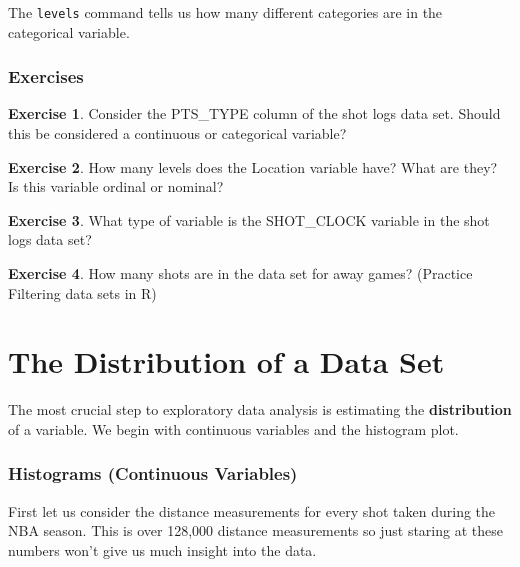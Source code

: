 \documentclass[
]{book}
\theoremstyle{definition}
\theoremstyle{definition}
\theoremstyle{definition}
\newtheorem{exercise}{Exercise}[chapter]
\theoremstyle{definition}
\theoremstyle{remark}
\begin{document}
The \texttt{levels} command tells us how many different categories are in the categorical variable.

\hypertarget{exercises}{%
\subsubsection{Exercises}\label{exercises}}

\begin{exercise}
\protect\hypertarget{exr:unnamed-chunk-59}{}\label{exr:unnamed-chunk-59}Consider the PTS\_TYPE column of the shot logs data set. Should this be considered a continuous or categorical variable?
\end{exercise}

\begin{exercise}
\protect\hypertarget{exr:unnamed-chunk-60}{}\label{exr:unnamed-chunk-60}How many levels does the Location variable have? What are they? Is this variable ordinal or nominal?
\end{exercise}

\begin{exercise}
\protect\hypertarget{exr:unnamed-chunk-61}{}\label{exr:unnamed-chunk-61}What type of variable is the SHOT\_CLOCK variable in the shot logs data set?
\end{exercise}

\begin{exercise}
\protect\hypertarget{exr:unnamed-chunk-62}{}\label{exr:unnamed-chunk-62}How many shots are in the data set for away games? (Practice Filtering data sets in R)
\end{exercise}

\hypertarget{the-distribution-of-a-data-set}{%
\section{The Distribution of a Data Set}\label{the-distribution-of-a-data-set}}

The most crucial step to exploratory data analysis is estimating the \textbf{distribution} of a variable. We begin with continuous variables and the histogram plot.

\hypertarget{histograms-continuous-variables}{%
\subsubsection{Histograms (Continuous Variables)}\label{histograms-continuous-variables}}

First let us consider the distance measurements for every shot taken during the NBA season. This is over 128,000 distance measurements so just staring at these numbers won't give us much insight into the data.
\end{document}

